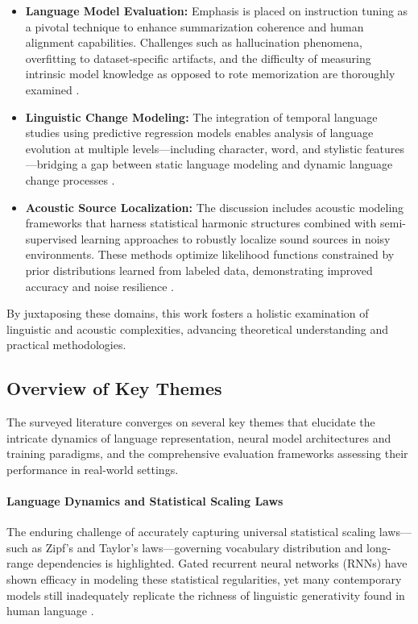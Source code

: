 \begin{itemize}
    \item \textbf{Language Model Evaluation:} Emphasis is placed on instruction tuning as a pivotal technique to enhance summarization coherence and human alignment capabilities. Challenges such as hallucination phenomena, overfitting to dataset-specific artifacts, and the difficulty of measuring intrinsic model knowledge as opposed to rote memorization are thoroughly examined \cite{ref10,ref51,ref52}.
    \item \textbf{Linguistic Change Modeling:} The integration of temporal language studies using predictive regression models enables analysis of language evolution at multiple levels---including character, word, and stylistic features---bridging a gap between static language modeling and dynamic language change processes \cite{ref41}.
    \item \textbf{Acoustic Source Localization:} The discussion includes acoustic modeling frameworks that harness statistical harmonic structures combined with semi-supervised learning approaches to robustly localize sound sources in noisy environments. These methods optimize likelihood functions constrained by prior distributions learned from labeled data, demonstrating improved accuracy and noise resilience \cite{ref1,ref2,ref3,ref26,ref51}.
\end{itemize}

By juxtaposing these domains, this work fosters a holistic examination of linguistic and acoustic complexities, advancing theoretical understanding and practical methodologies.

\subsection{Overview of Key Themes}

The surveyed literature converges on several key themes that elucidate the intricate dynamics of language representation, neural model architectures and training paradigms, and the comprehensive evaluation frameworks assessing their performance in real-world settings.

\paragraph{Language Dynamics and Statistical Scaling Laws}  
The enduring challenge of accurately capturing universal statistical scaling laws—such as Zipf’s and Taylor’s laws—governing vocabulary distribution and long-range dependencies is highlighted. Gated recurrent neural networks (RNNs) have shown efficacy in modeling these statistical regularities, yet many contemporary models still inadequately replicate the richness of linguistic generativity found in human language \cite{ref51}.

